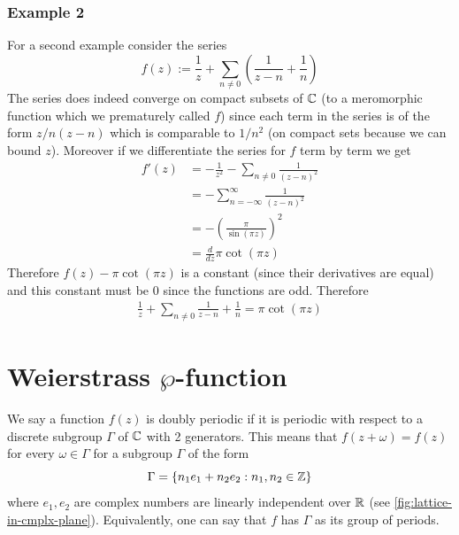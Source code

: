\subsubsection{Example 2}
For a second example consider the series
$$f(z) := \frac{1}{z} + \sum_{n \neq 0} \left( \frac{1}{z - n} + \frac{1}{n} \right)$$
The series does indeed converge on compact subsets of $\mathbb{C}$ (to a meromorphic function which we prematurely called $f$) since each term in the series is of the form $z/n(z - n)$ which is comparable to $1/n^2$ (on compact sets because we can bound $z$). Moreover if we differentiate the series for $f$ term by term we get
\begin{align*}
    f'(z) &= -\frac{1}{z^2} - \sum_{n \neq 0} \frac{1}{(z - n)^2}\\
    &= -\sum_{n = -\infty}^\infty \frac{1}{(z - n)^2}\\
    &= - \left( \frac{\pi}{\sin(\pi z)} \right)^2\\
    &= \frac{d}{dz} \pi \cot(\pi z)
\end{align*}
Therefore $f(z) - \pi \cot(\pi z)$ is a constant (since their derivatives are equal) and this constant must be 0 since the functions are odd. Therefore
\begin{align*}
    \frac{1}{z} + \sum_{n \neq 0} \frac{1}{z - n} + \frac{1}{n} = \pi \cot(\pi z)
\end{align*}

\section{Weierstrass $\wp$-function}
We say a function $f(z)$ is doubly periodic if it is periodic with respect to a discrete subgroup $\Gamma$ of $\mathbb{C}$ with 2 generators. This means that $f(z + \omega) = f(z)$ for every $\omega \in \Gamma$ for a subgroup $\Gamma$ of the form 
$$\Gamma = \{n_1 e_1 + n_2 e_2 : n_1, n_2 \in \mathbb{Z}\}$$
where $e_1, e_2$ are complex numbers are linearly independent over $\mathbb{R}$ (see \autoref{fig:lattice-in-cmplx-plane}). Equivalently, one can say that $f$ has $\Gamma$ as its group of periods.

